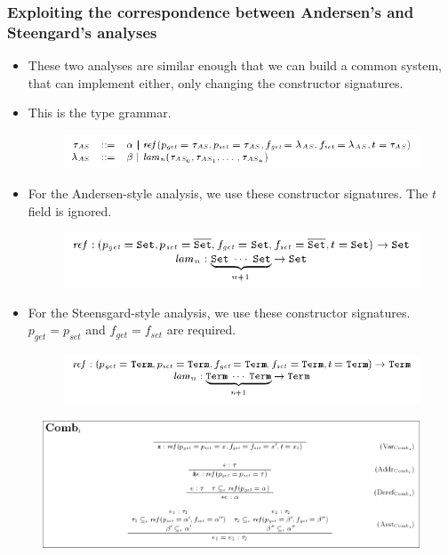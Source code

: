 \documentclass{beamer}
\begin{document}
\begin{frame}[allowframebreaks]
  \frametitle{Exploiting the correspondence between Andersen's and
    Steengard's analyses}

  \begin{itemize}
  \item These two analyses are similar enough that we can build a
    common system,  that can implement either, only
    changing the constructor signatures.
  \item This is the type grammar.
    \begin{figure}
      \centering
      \includegraphics[scale=0.3]{combination_type_grammar.png}
    \end{figure}
  \item For the Andersen-style analysis, we use these constructor
    signatures. The $t$ field is ignored.
    \begin{figure}
      \centering
      \includegraphics[scale=0.3]{combination_andersen_constructor_signatures.png}
    \end{figure}
  \item For the Steensgard-style analysis, we use these constructor
    signatures. $p_{get} = p_{set}$ and $f_{get} = f_{set}$ are required.
    \begin{figure}
      \centering
      \includegraphics[scale=0.3]{combination_steensgard_constructor_signatures.png}
    \end{figure}

  \end{itemize}

  \framebreak

  \begin{figure}
    \centering
    \includegraphics[scale=0.3]{combination_inference_rules.png}
  \end{figure}


\end{frame}
\end{document}
